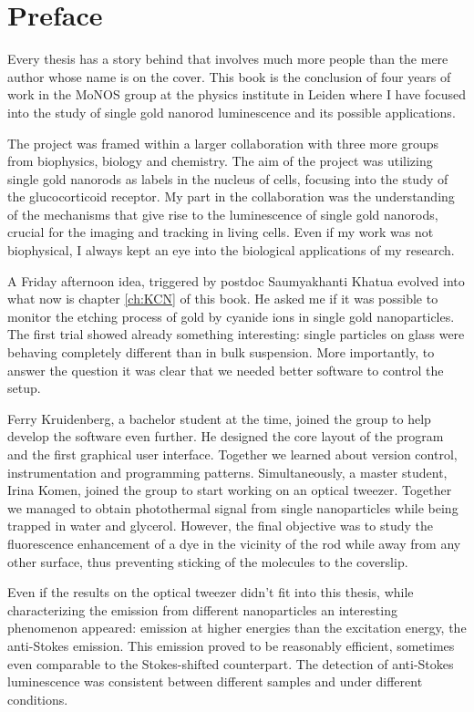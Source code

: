 \chapter*{Preface}

Every thesis has a story behind that involves much more people than the mere
author whose name is on the cover. This book is the conclusion of four years of
work in the MoNOS group at the physics institute in Leiden where I have focused
into the study of single gold nanorod luminescence and its possible applications. 

The project was framed within a larger collaboration with three more groups from
biophysics, biology and chemistry. The aim of the project was utilizing single
gold nanorods as labels in the nucleus of cells, focusing into the study of the
glucocorticoid receptor. My part in the collaboration was the understanding of
the mechanisms that give rise to the luminescence of single gold nanorods,
crucial for the imaging and tracking in living cells. Even if my work was not
biophysical, I always kept an eye into the biological applications of my
research.

A Friday afternoon idea, triggered by postdoc Saumyakhanti Khatua evolved into
what now is chapter \ref{ch:KCN} of this book. He asked me if it was possible to
monitor the etching process of gold by cyanide ions in single gold
nanoparticles. The first trial showed already something interesting: single
particles on glass were behaving completely different than in bulk suspension.
More importantly, to answer the question it was clear that we needed better
software to control the setup.

Ferry Kruidenberg, a bachelor student at the time, joined the group to help
develop the software even further. He designed the core layout of the program
and the first graphical user interface. Together we learned about version
control, instrumentation and programming patterns. Simultaneously, a master
student, Irina Komen, joined the group to start working on an optical tweezer.
Together we managed to obtain photothermal signal from single nanoparticles
while being trapped in water and glycerol. However, the final objective was to
study the fluorescence enhancement of a dye in the vicinity of the rod while
away from any other surface, thus preventing sticking of the molecules to the
coverslip.

Even if the results on the optical tweezer didn't fit into this thesis, while
characterizing the emission from different nanoparticles an interesting
phenomenon appeared: emission at higher energies than the excitation energy, the
anti-Stokes emission. This emission proved to be reasonably efficient, sometimes
even comparable to the Stokes-shifted counterpart. The detection of anti-Stokes
luminescence was consistent between different samples and under different
conditions.

